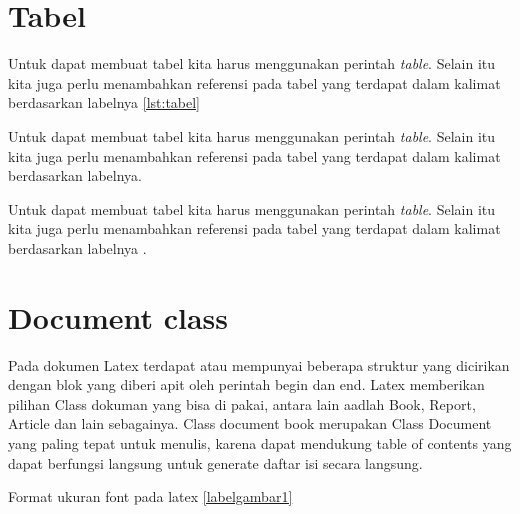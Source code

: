 \section{Tabel}

Untuk dapat membuat tabel kita harus menggunakan perintah \textit{table}. Selain itu kita juga perlu menambahkan referensi pada tabel yang terdapat dalam kalimat berdasarkan labelnya \ref{lst:tabel}




Untuk dapat membuat tabel kita harus menggunakan perintah \textit{table}. Selain itu kita juga perlu menambahkan referensi pada tabel yang terdapat dalam kalimat berdasarkan labelnya.

Untuk dapat membuat tabel kita harus menggunakan perintah \textit{table}. Selain itu kita juga perlu menambahkan referensi pada tabel yang terdapat dalam kalimat berdasarkan labelnya \cite{kartikamodul}. 



\section{Document class}

Pada dokumen Latex terdapat atau mempunyai beberapa struktur yang dicirikan dengan blok yang diberi apit oleh perintah begin dan end. Latex memberikan pilihan Class dokuman yang bisa di pakai, antara lain aadlah Book, Report, Article dan lain sebagainya. Class document book merupakan Class Document yang paling tepat untuk menulis, karena dapat mendukung table of contents yang dapat berfungsi langsung untuk generate daftar isi secara langsung.


Format ukuran font pada latex \ref{labelgambar1}

